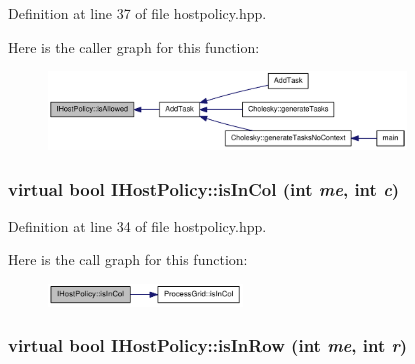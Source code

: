 Definition at line 37 of file hostpolicy.hpp.

Here is the caller graph for this function:\nopagebreak
\begin{figure}[H]
\begin{center}
\leavevmode
\includegraphics[width=269pt]{class_i_host_policy_a5200e3143a640e492438361a3fd2626a_icgraph}
\end{center}
\end{figure}
\hypertarget{class_i_host_policy_ac886a2d16e0914619ba9423f697c5e1a}{
\subsubsection[{isInCol}]{\setlength{\rightskip}{0pt plus 5cm}virtual bool IHostPolicy::isInCol (int {\em me}, \/  int {\em c})}}
\label{class_i_host_policy_ac886a2d16e0914619ba9423f697c5e1a}


Definition at line 34 of file hostpolicy.hpp.

Here is the call graph for this function:\nopagebreak
\begin{figure}[H]
\begin{center}
\leavevmode
\includegraphics[width=146pt]{class_i_host_policy_ac886a2d16e0914619ba9423f697c5e1a_cgraph}
\end{center}
\end{figure}
\hypertarget{class_i_host_policy_aed5e7b81736d6e950897a8e341cc9a2c}{
\subsubsection[{isInRow}]{\setlength{\rightskip}{0pt plus 5cm}virtual bool IHostPolicy::isInRow (int {\em me}, \/  int {\em r})}}
\label{class_i_host_policy_aed5e7b81736d6e950897a8e341cc9a2c}


